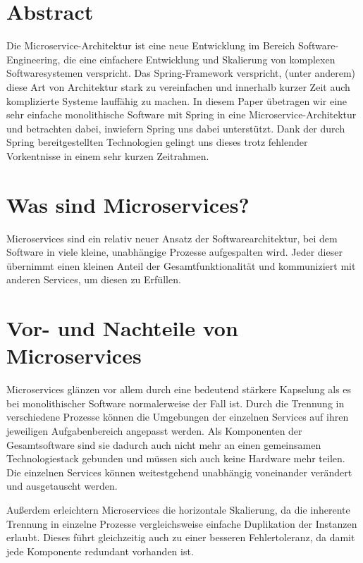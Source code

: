 \documentclass{article}
\begin{document}
\section{Abstract}

Die Microservice-Architektur ist eine neue Entwicklung im Bereich Software-Engineering, die eine einfachere Entwicklung und Skalierung von komplexen Softwaresystemen verspricht.
Das Spring-Framework verspricht, (unter anderem) diese Art von Architektur stark zu vereinfachen und innerhalb kurzer Zeit auch komplizierte Systeme lauffähig zu machen.
In diesem Paper übetragen wir eine sehr einfache monolithische Software mit Spring in eine Microservice-Architektur und betrachten dabei, inwiefern Spring uns dabei unterstützt.
Dank der durch Spring bereitgestellten Technologien gelingt uns dieses trotz fehlender Vorkentnisse in einem sehr kurzen Zeitrahmen.

\section{Was sind Microservices?}

Microservices sind ein relativ neuer Ansatz der Softwarearchitektur, bei dem Software in viele kleine, unabhängige Prozesse aufgespalten wird.
Jeder dieser übernimmt einen kleinen Anteil der Gesamtfunktionalität und kommuniziert mit anderen Services, um diesen zu Erfüllen.\cite{OMA}

\section{Vor- und Nachteile von Microservices}

Microservices glänzen vor allem durch eine bedeutend stärkere Kapselung als es bei monolithischer Software normalerweise der Fall ist.
Durch die Trennung in verschiedene Prozesse können die Umgebungen der einzelnen Services auf ihren jeweiligen Aufgabenbereich angepasst werden.
Als Komponenten der Gesamtsoftware sind sie dadurch auch nicht mehr an einen gemeinsamen Technologiestack gebunden und müssen sich auch keine Hardware mehr teilen.
Die einzelnen Services können weitestgehend unabhängig voneinander verändert und ausgetauscht werden.\cite{EMMA}

Außerdem erleichtern Microservices die horizontale Skalierung, da die inherente Trennung in einzelne Prozesse vergleichsweise einfache Duplikation der Instanzen erlaubt.
Dieses führt gleichzeitig auch zu einer besseren Fehlertoleranz, da damit jede Komponente redundant vorhanden ist.\cite{OMA}
\end{document}
